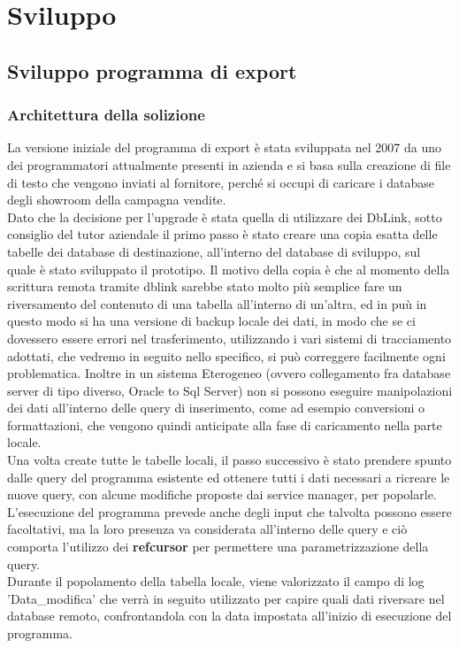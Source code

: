 \lstset{
showstringspaces=false
}
\section{Sviluppo}
\subsection{Sviluppo programma di export}
\subsubsection{Architettura della solizione}
La versione iniziale del programma di export è stata sviluppata nel 2007 da uno dei programmatori attualmente presenti in azienda e si basa sulla creazione di file di testo che vengono inviati al fornitore, perché si occupi di caricare i database degli showroom della campagna vendite.\\
Dato che la decisione per l'upgrade è stata quella di utilizzare dei DbLink, sotto consiglio del tutor aziendale il primo passo è stato creare una copia esatta delle tabelle dei database di destinazione, all'interno del database di sviluppo, sul quale è stato sviluppato il prototipo. Il motivo della copia è che al momento della scrittura remota tramite dblink sarebbe stato molto più semplice fare un riversamento del contenuto di una tabella all'interno di un'altra, ed in puù in questo modo si ha una versione di backup locale dei dati, in modo che se ci dovessero essere errori nel trasferimento, utilizzando i vari sistemi di tracciamento adottati, che vedremo in seguito nello specifico, si può correggere facilmente ogni problematica. Inoltre in un sistema Eterogeneo (ovvero collegamento fra database server di tipo diverso, Oracle to Sql Server) non si possono eseguire manipolazioni dei dati all'interno delle query di inserimento, come ad esempio conversioni o formattazioni, che vengono quindi anticipate alla fase di caricamento nella parte locale.\\
Una volta create tutte le tabelle locali, il passo successivo è stato prendere spunto dalle query del programma esistente ed ottenere tutti i dati necessari a ricreare le nuove query, con alcune modifiche proposte dai service manager, per popolarle. L'esecuzione del programma prevede anche degli input che talvolta possono essere facoltativi, ma la loro presenza va considerata all'interno delle query e ciò comporta l'utilizzo dei \textbf{refcursor} per permettere una parametrizzazione della query.\\
Durante il popolamento della tabella locale, viene valorizzato il campo di log 'Data\_modifica' che verrà in seguito utilizzato per capire quali dati riversare nel database remoto, confrontandola con la data impostata all'inizio di esecuzione del programma.
